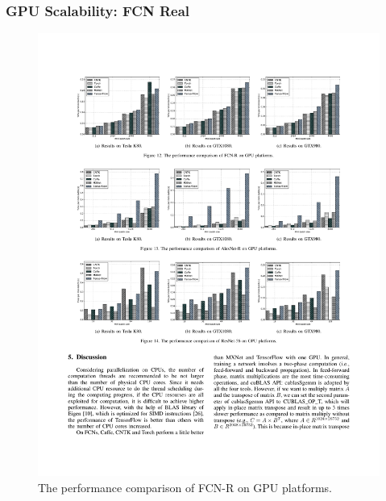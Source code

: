 \begin{frame}
	\MyLogo
	\frametitle{GPU Scalability: FCN Real}
	
	\begin{figure}[htbp] 
		\includegraphics[width=\linewidth]{figures/FCN-R2.pdf} 
		\caption{The performance comparison of FCN-R on GPU platforms.}
	\end{figure}

\end{frame}


